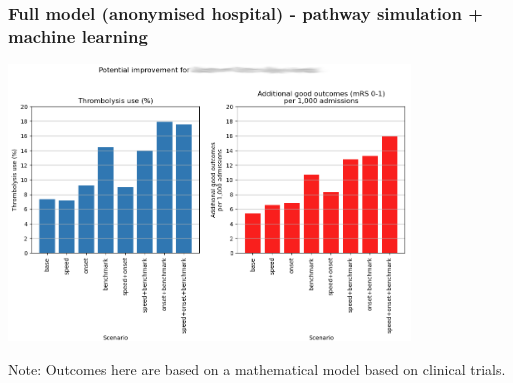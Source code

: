 \begin{frame}
\frametitle{Full model (anonymised hospital) - pathway simulation + machine learning}

\begin{center}
\includegraphics[width=0.8\textwidth]{./images_outcome/hosp_improvement_1}
\end{center}

\footnotesize
Note: Outcomes here are based on a mathematical model based on clinical trials.

\end{frame}
